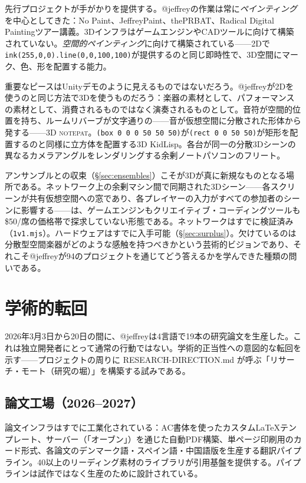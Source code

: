 \documentclass[10pt,letterpaper,twocolumn]{article}
\newcommand{\np}{\textsc{notepat}}
\begin{document}
先行プロジェクトが手がかりを提供する。@jeffreyの作業は常に\emph{ペインティング}を中心としてきた：No Paint、JeffreyPaint、thePRBAT、Radical Digital Paintingツアー講義。3DインフラはゲームエンジンやCADツールに向けて構築されていない。\emph{空間的ペインティング}に向けて構築されている——2Dで\texttt{ink(255,0,0).line(0,0,100,100)}が提供するのと同じ即時性で、3D空間にマーク、色、形を配置する能力。

重要なピースはUnityデモのように見えるものではないだろう。@jeffreyが2Dを使うのと同じ方法で3Dを使うものだろう：楽器の素材として、パフォーマンスの素材として、消費されるものではなく演奏されるものとして。音符が空間的位置を持ち、ルームリバーブが文字通りの——音が仮想空間に分散された形体から発する——3D \np{}。\texttt{(box 0 0 0 50 50 50)}が\texttt{(rect 0 0 50 50)}が矩形を配置するのと同様に立方体を配置する3D KidLisp。各台が同一の分散3Dシーンの異なるカメラアングルをレンダリングする余剰ノートパソコンのフリート。

アンサンブルとの収束（\S\ref{sec:ensembles}）こそが3Dが真に新規なものとなる場所である。ネットワーク上の余剰マシン間で同期された3Dシーン——各スクリーンが共有仮想空間への窓であり、各プレイヤーの入力がすべての参加者のシーンに影響する——は、ゲームエンジンもクリエイティブ・コーディングツールも\$50/席の価格帯で探求していない形態である。ネットワークはすでに検証済み（\texttt{1v1.mjs}）。ハードウェアはすでに入手可能（\S\ref{sec:surplus}）。欠けているのは分散型空間楽器がどのような感触を持つべきかという芸術的ビジョンであり、それこそ@jeffreyが94のプロジェクトを通じてどう答えるかを学んできた種類の問いである。


\section{学術的転回}
\label{sec:scholarly}

2026年3月3日から20日の間に、@jeffreyは4言語で19本の研究論文を生産した。これは独立開発者にとって通常の行動ではない。学術的正当性への意図的な転回を示す——プロジェクトの周りに RESEARCH-DIRECTION.md が呼ぶ「リサーチ・モート（研究の堀）」を構築する試みである。

\subsection{論文工場（2026--2027）}

論文インフラはすでに工業化されている：AC書体を使ったカスタム\LaTeX{}テンプレート、サーバー（「オーブン」）を通じた自動PDF構築、単ページ印刷用のカード形式、各論文のデンマーク語・スペイン語・中国語版を生産する翻訳パイプライン。40以上のリーディング素材のライブラリが引用基盤を提供する。パイプラインは試作ではなく生産のために設計されている。
\end{document}
